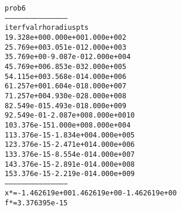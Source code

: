 \begin{alltt}
prob6
---------------------------------------------
iter        fval         rho      radius  pts
   1   9.328e+00   0.000e+00   1.000e+00    2
   2   5.769e+00   3.051e-01   2.000e+00    3
   3   5.769e+00  -9.087e-01   2.000e+00    4
   4   5.769e+00   6.853e-03   2.000e+00    5
   5   4.115e+00   3.568e-01   4.000e+00    6
   6   1.257e+00   1.604e-01   8.000e+00    7
   7   1.257e+00   4.930e-02   8.000e+00    8
   8   2.549e-01   5.493e-01   8.000e+00    9
   9   2.549e-01  -2.087e+00   8.000e+00   10
  10   3.376e-15   1.000e+00   8.000e+00    4
  11   3.376e-15  -1.834e+00   4.000e+00    5
  12   3.376e-15  -2.471e+01   4.000e+00    6
  13   3.376e-15  -8.554e-01   4.000e+00    7
  14   3.376e-15  -2.891e-01   4.000e+00    8
  15   3.376e-15  -2.219e-01   4.000e+00    9
---------------------------------------------
x* = -1.462619e+00  1.462619e+00  -1.462619e+00  
f* = 3.376395e-15
\end{alltt}
